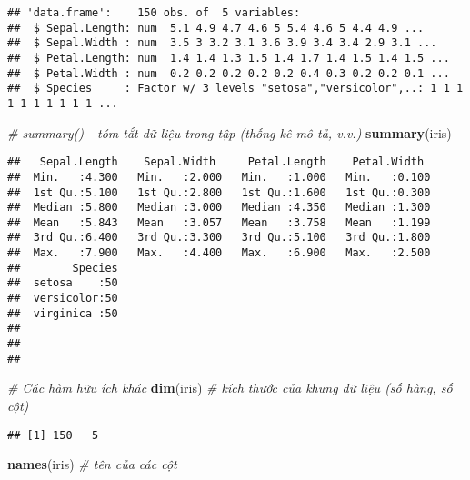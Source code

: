 \documentclass[
]{article}
\newenvironment{Shaded}{\begin{snugshade}}{\end{snugshade}}
\newcommand{\CommentTok}[1]{\textcolor[rgb]{0.56,0.35,0.01}{\textit{#1}}}
\newcommand{\FunctionTok}[1]{\textcolor[rgb]{0.13,0.29,0.53}{\textbf{#1}}}
\newcommand{\NormalTok}[1]{#1}
\begin{document}
\begin{verbatim}
## 'data.frame':    150 obs. of  5 variables:
##  $ Sepal.Length: num  5.1 4.9 4.7 4.6 5 5.4 4.6 5 4.4 4.9 ...
##  $ Sepal.Width : num  3.5 3 3.2 3.1 3.6 3.9 3.4 3.4 2.9 3.1 ...
##  $ Petal.Length: num  1.4 1.4 1.3 1.5 1.4 1.7 1.4 1.5 1.4 1.5 ...
##  $ Petal.Width : num  0.2 0.2 0.2 0.2 0.2 0.4 0.3 0.2 0.2 0.1 ...
##  $ Species     : Factor w/ 3 levels "setosa","versicolor",..: 1 1 1 1 1 1 1 1 1 1 ...
\end{verbatim}

\begin{Shaded}
\begin{Highlighting}[]
\CommentTok{\# summary() {-} tóm tắt dữ liệu trong tập (thống kê mô tả, v.v.)}
\FunctionTok{summary}\NormalTok{(iris)}
\end{Highlighting}
\end{Shaded}

\begin{verbatim}
##   Sepal.Length    Sepal.Width     Petal.Length    Petal.Width   
##  Min.   :4.300   Min.   :2.000   Min.   :1.000   Min.   :0.100  
##  1st Qu.:5.100   1st Qu.:2.800   1st Qu.:1.600   1st Qu.:0.300  
##  Median :5.800   Median :3.000   Median :4.350   Median :1.300  
##  Mean   :5.843   Mean   :3.057   Mean   :3.758   Mean   :1.199  
##  3rd Qu.:6.400   3rd Qu.:3.300   3rd Qu.:5.100   3rd Qu.:1.800  
##  Max.   :7.900   Max.   :4.400   Max.   :6.900   Max.   :2.500  
##        Species  
##  setosa    :50  
##  versicolor:50  
##  virginica :50  
##                 
##                 
## 
\end{verbatim}

\begin{Shaded}
\begin{Highlighting}[]
\CommentTok{\# Các hàm hữu ích khác}
\FunctionTok{dim}\NormalTok{(iris)  }\CommentTok{\# kích thước của khung dữ liệu (số hàng, số cột)}
\end{Highlighting}
\end{Shaded}

\begin{verbatim}
## [1] 150   5
\end{verbatim}

\begin{Shaded}
\begin{Highlighting}[]
\FunctionTok{names}\NormalTok{(iris)  }\CommentTok{\# tên của các cột}
\end{Highlighting}
\end{Shaded}
\end{document}
